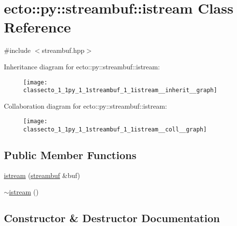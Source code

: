 \hypertarget{classecto_1_1py_1_1streambuf_1_1istream}{}\section{ecto\+:\+:py\+:\+:streambuf\+:\+:istream Class Reference}
\label{classecto_1_1py_1_1streambuf_1_1istream}


{\ttfamily \#include $<$streambuf.\+hpp$>$}



Inheritance diagram for ecto\+:\+:py\+:\+:streambuf\+:\+:istream\+:\nopagebreak
\begin{figure}[H]
\begin{center}
\leavevmode
\texttt{[image: classecto\_1\_1py\_1\_1streambuf\_1\_1istream\_\_inherit\_\_graph]}
\end{center}
\end{figure}


Collaboration diagram for ecto\+:\+:py\+:\+:streambuf\+:\+:istream\+:\nopagebreak
\begin{figure}[H]
\begin{center}
\leavevmode
\texttt{[image: classecto\_1\_1py\_1\_1streambuf\_1\_1istream\_\_coll\_\_graph]}
\end{center}
\end{figure}
\subsection*{Public Member Functions}
\begin{DoxyCompactItemize}
\item 
\hyperlink{classecto_1_1py_1_1streambuf_1_1istream_aff2d95cb5e4b1113f873b7a7e1cead29}{istream} (\hyperlink{classecto_1_1py_1_1streambuf}{streambuf} \&buf)
\item 
\hyperlink{classecto_1_1py_1_1streambuf_1_1istream_ab53f3c2893d995a22ef2374ce9a00004}{$\sim$istream} ()
\end{DoxyCompactItemize}


\subsection{Constructor \& Destructor Documentation}
\hypertarget{classecto_1_1py_1_1streambuf_1_1istream_aff2d95cb5e4b1113f873b7a7e1cead29}{}
